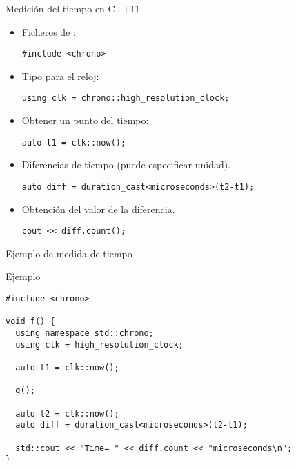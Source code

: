 \begin{frame}[t,fragile]{Medición del tiempo en C++11}
\begin{itemize}

\item Ficheros de :
\begin{lstlisting}
#include <chrono>
\end{lstlisting}

\item Tipo para el reloj:
\begin{lstlisting}
using clk = chrono::high_resolution_clock;
\end{lstlisting}

\item Obtener un punto del tiempo:
\begin{lstlisting}
auto t1 = clk::now();
\end{lstlisting}

\item Diferencias de tiempo (puede especificar unidad).
\begin{lstlisting}
auto diff = duration_cast<microseconds>(t2-t1);
\end{lstlisting}

\item Obtención del valor de la diferencia.
\begin{lstlisting}
cout << diff.count();
\end{lstlisting}

\end{itemize}
\end{frame}

\begin{frame}[t,fragile]{Ejemplo de medida de tiempo}
\begin{block}{Ejemplo}
\begin{lstlisting}
#include <chrono>

void f() {
  using namespace std::chrono;
  using clk = high_resolution_clock;

  auto t1 = clk::now();

  g();

  auto t2 = clk::now();
  auto diff = duration_cast<microseconds>(t2-t1);

  std::cout << "Time= " << diff.count << "microseconds\n";
}
\end{lstlisting}
\end{block}
\end{frame}

